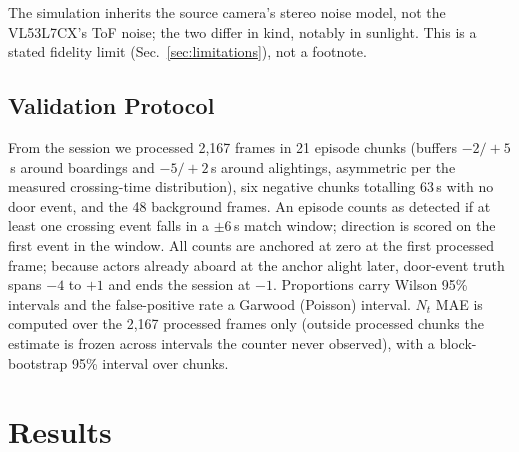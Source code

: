 \documentclass[conference]{IEEEtran}
\begin{document}
The simulation inherits the source camera's stereo noise model, not the
VL53L7CX's ToF noise; the two differ in kind, notably in sunlight. This is a
stated fidelity limit (Sec.~\ref{sec:limitations}), not a footnote.

\subsection{Validation Protocol}

From the session we processed 2{,}167 frames in 21 episode chunks (buffers
$-2/{+}5$\,s around boardings and $-5/{+}2$\,s around alightings, asymmetric
per the measured crossing-time distribution), six negative chunks totalling
63\,s with no door event, and the 48 background frames. An episode counts as
detected if at least one crossing event falls in a $\pm$6\,s match window;
direction is scored on the first event in the window. All counts are anchored
at zero at the first processed frame; because actors already aboard at the
anchor alight later, door-event truth spans $-4$ to $+1$ and ends the session
at $-1$. Proportions carry Wilson 95\% intervals and the false-positive rate
a Garwood (Poisson) interval. $N_t$ MAE is computed over the 2{,}167
processed frames only (outside processed chunks the estimate is frozen
across intervals the counter never observed), with a block-bootstrap 95\%
interval over chunks.

\section{Results}
\label{sec:results}
\end{document}
